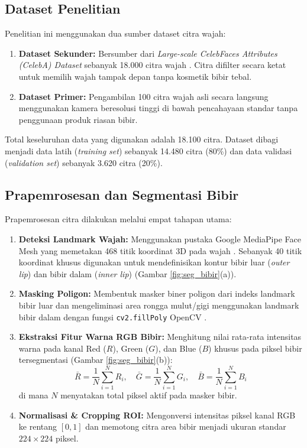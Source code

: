 \documentclass[10pt,a4paper]{article}
\begin{document}
\subsection{Dataset Penelitian}
Penelitian ini menggunakan dua sumber dataset citra wajah:
\begin{enumerate}
 \item \textbf{Dataset Sekunder:} Bersumber dari \textit{Large-scale CelebFaces Attributes (CelebA) Dataset} sebanyak 18.000 citra wajah \cite{liu2015faceattributes}. Citra difilter secara ketat untuk memilih wajah tampak depan tanpa kosmetik bibir tebal.
 \item \textbf{Dataset Primer:} Pengambilan 100 citra wajah asli secara langsung menggunakan kamera beresolusi tinggi di bawah pencahayaan standar tanpa penggunaan produk riasan bibir.
\end{enumerate}
Total keseluruhan data yang digunakan adalah 18.100 citra. Dataset dibagi menjadi data latih (\textit{training set}) sebanyak 14.480 citra (80\%) dan data validasi (\textit{validation set}) sebanyak 3.620 citra (20\%).

\subsection{Prapemrosesan dan Segmentasi Bibir}
Prapemrosesan citra dilakukan melalui empat tahapan utama:
\begin{enumerate}
 \item \textbf{Deteksi Landmark Wajah:} Menggunakan pustaka Google MediaPipe Face Mesh yang memetakan 468 titik koordinat 3D pada wajah \cite{lugaresi2019mediapipe}. Sebanyak 40 titik koordinat khusus digunakan untuk mendefinisikan kontur bibir luar (\textit{outer lip}) dan bibir dalam (\textit{inner lip}) (Gambar \ref{fig:seg_bibir}(a)).
 \item \textbf{Masking Poligon:} Membentuk masker biner poligon dari indeks landmark bibir luar dan mengeliminasi area rongga mulut/gigi menggunakan landmark bibir dalam dengan fungsi \texttt{cv2.fillPoly} OpenCV \cite{bradski2000opencv}.
 \item \textbf{Ekstraksi Fitur Warna RGB Bibir:} Menghitung nilai rata-rata intensitas warna pada kanal Red ($R$), Green ($G$), dan Blue ($B$) khusus pada piksel bibir tersegmentasi (Gambar \ref{fig:seg_bibir}(b)):
 \begin{equation}
 \bar{R} = \frac{1}{N}\sum_{i=1}^{N} R_i, \quad \bar{G} = \frac{1}{N}\sum_{i=1}^{N} G_i, \quad \bar{B} = \frac{1}{N}\sum_{i=1}^{N} B_i
 \end{equation}
 di mana $N$ menyatakan total piksel aktif pada masker bibir.
 \item \textbf{Normalisasi \& Cropping ROI:} Mengonversi intensitas piksel kanal RGB ke rentang $[0, 1]$ dan memotong citra area bibir menjadi ukuran standar $224 \times 224$ piksel.
\end{enumerate}
\end{document}
